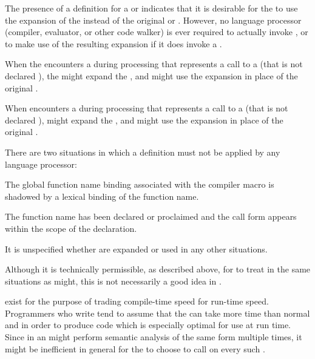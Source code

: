 \endsubsubsubsection%


The presence of a  definition for a  or 
indicates that it is desirable for the  to use the expansion
of the  instead of the original  or
.  However, no language processor
(compiler, evaluator, or other code walker) is ever required to actually
invoke , or to 
make use of the resulting expansion if it does invoke 
a .

When the  encounters a  during processing that represents
a call to a   (that is not declared ),
the  might expand the , 
and might use the expansion in place of the original .

When  encounters a  during processing that represents 
a call to a   (that is not declared ),
 might expand the ,
and might use the expansion in place of the original .

There are two situations in which a  definition must not be
applied by any language processor:

\beginlist
\itemitem{\bull}
 The global function name binding associated with the compiler
 macro is shadowed by a lexical binding of the function name.

\itemitem{\bull}
 The function name has been declared or proclaimed  and
 the call form appears within the scope of the declaration.
\endlist

It is unspecified whether  are expanded or used in any other
situations.


Although it is technically permissible, as described above,
for  to treat  in the same situations
as  might, this is not necessarily a good idea in
.

 exist for the purpose of trading compile-time speed
for run-time speed.  Programmers who write  tend to
assume that the  can take more time than normal 
and  in order to produce code which is especially optimal for use
at run time.  Since  in an 
might perform semantic analysis of the same form multiple times, it might be 
inefficient in general for the  to choose to call
 on every such .

